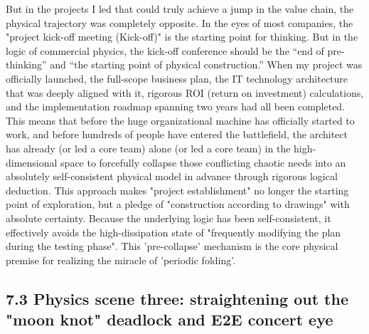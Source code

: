 \documentclass[11pt,a4paper]{article}
\begin{document}
But in the projects I led that could truly achieve a jump in the value chain, the physical trajectory was completely opposite. In the eyes of most companies, the "project kick-off meeting (Kick-off)" is the starting point for thinking. But in the logic of commercial physics, the kick-off conference should be the “end of pre-thinking” and “the starting point of physical construction.” When my project was officially launched, the full-scope business plan, the IT technology architecture that was deeply aligned with it, rigorous ROI (return on investment) calculations, and the implementation roadmap spanning two years had all been completed. This means that before the huge organizational machine has officially started to work, and before hundreds of people have entered the battlefield, the architect has already (or led a core team) alone (or led a core team) in the high-dimensional space to forcefully collapse those conflicting chaotic needs into an absolutely self-consistent physical model in advance through rigorous logical deduction. This approach makes "project establishment" no longer the starting point of exploration, but a pledge of "construction according to drawings" with absolute certainty. Because the underlying logic has been self-consistent, it effectively avoids the high-dissipation state of "frequently modifying the plan during the testing phase". This 'pre-collapse' mechanism is the core physical premise for realizing the miracle of 'periodic folding'.


\subsection*{7.3 Physics scene three: straightening out the "moon knot" deadlock and E2E concert eye}
\end{document}

